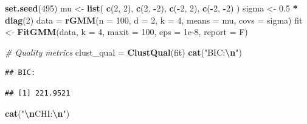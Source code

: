 \documentclass[12pt]{article}
\newenvironment{Shaded}{\begin{snugshade}}{\end{snugshade}}
\newcommand{\AttributeTok}[1]{\textcolor[rgb]{0.13,0.29,0.53}{#1}}
\newcommand{\CommentTok}[1]{\textcolor[rgb]{0.56,0.35,0.01}{\textit{#1}}}
\newcommand{\DecValTok}[1]{\textcolor[rgb]{0.00,0.00,0.81}{#1}}
\newcommand{\FloatTok}[1]{\textcolor[rgb]{0.00,0.00,0.81}{#1}}
\newcommand{\FunctionTok}[1]{\textcolor[rgb]{0.13,0.29,0.53}{\textbf{#1}}}
\newcommand{\NormalTok}[1]{#1}
\newcommand{\OtherTok}[1]{\textcolor[rgb]{0.56,0.35,0.01}{#1}}
\newcommand{\SpecialCharTok}[1]{\textcolor[rgb]{0.81,0.36,0.00}{\textbf{#1}}}
\newcommand{\StringTok}[1]{\textcolor[rgb]{0.31,0.60,0.02}{#1}}
\begin{document}
\begin{Shaded}
\begin{Highlighting}[]
\FunctionTok{set.seed}\NormalTok{(}\DecValTok{495}\NormalTok{)}
\NormalTok{mu }\OtherTok{\textless{}{-}} \FunctionTok{list}\NormalTok{(}
  \FunctionTok{c}\NormalTok{(}\DecValTok{2}\NormalTok{, }\DecValTok{2}\NormalTok{),}
  \FunctionTok{c}\NormalTok{(}\DecValTok{2}\NormalTok{, }\SpecialCharTok{{-}}\DecValTok{2}\NormalTok{),}
  \FunctionTok{c}\NormalTok{(}\SpecialCharTok{{-}}\DecValTok{2}\NormalTok{, }\DecValTok{2}\NormalTok{),}
  \FunctionTok{c}\NormalTok{(}\SpecialCharTok{{-}}\DecValTok{2}\NormalTok{, }\SpecialCharTok{{-}}\DecValTok{2}\NormalTok{)}
\NormalTok{)}
\NormalTok{sigma }\OtherTok{\textless{}{-}} \FloatTok{0.5} \SpecialCharTok{*} \FunctionTok{diag}\NormalTok{(}\DecValTok{2}\NormalTok{)}
\NormalTok{data }\OtherTok{=} \FunctionTok{rGMM}\NormalTok{(}\AttributeTok{n =} \DecValTok{100}\NormalTok{, }\AttributeTok{d =} \DecValTok{2}\NormalTok{, }\AttributeTok{k =} \DecValTok{4}\NormalTok{, }\AttributeTok{means =}\NormalTok{ mu, }\AttributeTok{covs =}\NormalTok{ sigma)}
\NormalTok{fit }\OtherTok{\textless{}{-}} \FunctionTok{FitGMM}\NormalTok{(data, }\AttributeTok{k =} \DecValTok{4}\NormalTok{, }\AttributeTok{maxit =} \DecValTok{100}\NormalTok{, }\AttributeTok{eps =} \FloatTok{1e{-}8}\NormalTok{, }\AttributeTok{report =}\NormalTok{ F)}

\CommentTok{\# Quality metrics}
\NormalTok{clust\_qual }\OtherTok{=} \FunctionTok{ClustQual}\NormalTok{(fit)}
\FunctionTok{cat}\NormalTok{(}\StringTok{"BIC:}\SpecialCharTok{\textbackslash{}n}\StringTok{"}\NormalTok{)}
\end{Highlighting}
\end{Shaded}

\begin{verbatim}
## BIC:
\end{verbatim}

\begin{Shaded}
\end{Shaded}

\begin{verbatim}
## [1] 221.9521
\end{verbatim}

\begin{Shaded}
\begin{Highlighting}[]
\FunctionTok{cat}\NormalTok{(}\StringTok{"}\SpecialCharTok{\textbackslash{}n}\StringTok{CHI:}\SpecialCharTok{\textbackslash{}n}\StringTok{"}\NormalTok{)}
\end{Highlighting}
\end{Shaded}
\end{document}

